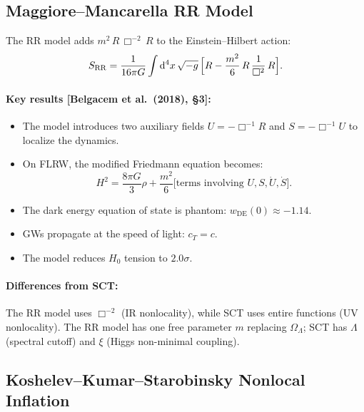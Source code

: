 \documentclass[12pt,a4paper]{article}
\theoremstyle{definition}
\theoremstyle{remark}
\newcommand{\dd}{\mathrm{d}}
\newcommand{\fromlit}[1]{\textcolor{blue!70!black}{\textsf{[#1]}}}
\begin{document}
\subsection{Maggiore--Mancarella RR Model}\label{sec:MM}

The RR model \cite{BDFM18,DFKKM14} adds $m^2\,R\,\Box^{-2}\,R$ to
the Einstein--Hilbert action:
\begin{equation}\label{eq:RR-action}
  S_{\mathrm{RR}} = \frac{1}{16\pi G}\int\dd^4 x\,\sqrt{-g}\,
  \Bigl[R - \frac{m^2}{6}\,R\,\frac{1}{\Box^2}\,R\Bigr].
\end{equation}

\paragraph{Key results \fromlit{Belgacem et al.\ (2018), \S3}:}
\begin{itemize}[nosep]
  \item The model introduces two auxiliary fields $U = -\Box^{-1}R$
    and $S = -\Box^{-1}U$ to localize the dynamics.
  \item On FLRW, the modified Friedmann equation becomes:
    \begin{equation}\label{eq:RR-friedmann}
      H^2 = \frac{8\pi G}{3}\rho
      + \frac{m^2}{6}\bigl[\text{terms involving }U, S, \dot{U},
      \dot{S}\bigr].
    \end{equation}
  \item The dark energy equation of state is phantom:
    $w_{\mathrm{DE}}(0) \approx -1.14$.
  \item GWs propagate at the speed of light: $c_T = c$.
  \item The model reduces $H_0$ tension to $2.0\sigma$.
\end{itemize}

\paragraph{Differences from SCT:}
The RR model uses $\Box^{-2}$ (IR nonlocality), while SCT uses
entire functions (UV nonlocality). The RR model has one free parameter
$m$ replacing $\Omega_\Lambda$; SCT has $\Lambda$ (spectral cutoff)
and $\xi$ (Higgs non-minimal coupling).

\subsection{Koshelev--Kumar--Starobinsky Nonlocal Inflation}
\label{sec:KKS}
\end{document}
